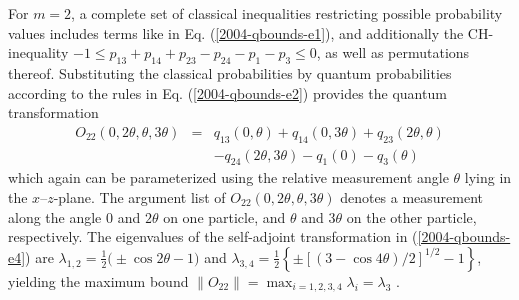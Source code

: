 \documentclass[prl,showpacs,showkeys,amsfonts,amsmath,twocolumn]{revtex4}
\begin{document}
For $m=2$, a complete
set of classical inequalities restricting possible probability values includes terms
like in Eq. (\ref{2004-qbounds-e1}),
and additionally the CH-inequality
$-1 \leq p_{13} + p_{14} + p_{23} - p_{24}- p_{1} -p_{3} \leq 0$, as well as permutations thereof.
Substituting
the classical probabilities by quantum probabilities according to the
rules in Eq. (\ref{2004-qbounds-e2}) provides the quantum
transformation
\begin{eqnarray}
O_{22}(0,2\theta,\theta,3\theta)&=&  q_{13}(0,\theta) +
q_{14}(0,3\theta) + q_{23}(2\theta,\theta) \nonumber\\
&&  - q_{24}(2\theta,3\theta)- q_{1}(0) - q_{3}(\theta)
\label{2004-qbounds-e4}
\end{eqnarray}
which again can be parameterized using the relative measurement angle $\theta$ lying in
the $x$--$z$-plane. The argument list of
$O_{22}(0,2\theta,\theta,3\theta)$ denotes  a measurement
along the angle $0$ and $2\theta$ on one particle, and $\theta$ and
$3\theta$ on the other particle, respectively.
The eigenvalues of the self-adjoint transformation in
(\ref{2004-qbounds-e4})
are $\lambda_{1,2} = \frac{1}{2}\big(\pm \cos 2\theta -
1\big)$ and $\lambda_{3,4} = \frac{1}{2}\left\{\pm\left[ \left(3-\cos 4\theta \right)/2\right]^{1/2} -1\right\}$,
yielding the maximum bound $\|
O_{22} \|= \max_{i=1,2,3,4} \lambda_i =\lambda_3 $ \cite{cabello-2003a,filipp-svo-04-qpoly}.
\end{document}
